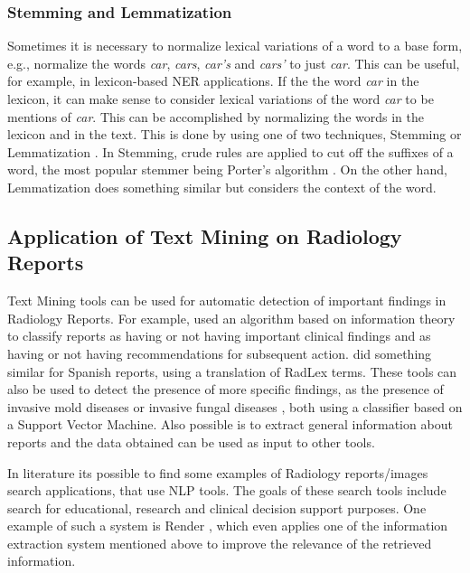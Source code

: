 \subsubsection{Stemming and Lemmatization}

Sometimes it is necessary to normalize lexical variations of a word to a base form, e.g., normalize the words \textit{car}, \textit{cars}, \textit{car’s} and \textit{cars’} to just \textit{car}. This can be useful, for example, in lexicon-based NER applications. If the the word \textit{car} in the lexicon, it can make sense to consider lexical variations of the word \textit{car} to be mentions of \textit{car}. This can be accomplished by normalizing the words in the lexicon and in the text. This is done by using one of two techniques, Stemming or Lemmatization \citep{Manning2009c}. In Stemming, crude rules are applied to cut off the suffixes of a word, the most popular stemmer being Porter’s algorithm \citep{Porter1980}. On the other hand, Lemmatization does something similar but considers the context of the word.  

\subsection{Application of Text Mining on Radiology Reports}

Text Mining tools can be used for automatic detection of important findings in Radiology Reports. For example, \citep{Dreyer2005} used an algorithm based on information theory to classify reports as having or not having important clinical findings and as having or not having recommendations for subsequent action. \citep{Cotik2015} did something similar for Spanish reports, using a translation of RadLex terms. These tools can also be used to detect the presence of more specific findings, as the presence of invasive mold diseases  \citep{Ananda-Rajah2014a} or invasive fungal diseases \citep{Martinez2015}, both using a classifier based on a Support Vector Machine. Also possible is to extract general information about reports \citep{Hassanpour2016} and the data obtained can be used as input to other tools.

In literature its possible to find some examples of Radiology reports/images search applications, that use NLP tools. The goals of these search tools include search for educational, research and clinical decision support purposes. One example of such a system is Render \citep{Dang2009}, which even applies one of the information extraction system mentioned above \citep{Dreyer2005} to improve the relevance of the retrieved information.

